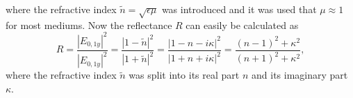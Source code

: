 where the refractive index $\tilde{n} = \sqrt{\epsilon \mu}$ was introduced and it was used that $\mu \approx 1$ for most mediums. Now the reflectance $R$ can easily be calculated as 
\begin{equation}
    R = \frac{|E_{0,1y}|^2}{|E_{0,1y}|^2} = \frac{|1- \tilde{n}|^2}{|1+ \tilde{n}|^2} = \frac{|1-n-i\kappa|^2}{|1+n+i\kappa|^2} = \frac{(n-1)^2+\kappa^2}{(n+1)^2+\kappa^2},
\end{equation} 
where the refractive index $\tilde{n}$ was split into its real part $n$ and its imaginary part $\kappa$.
